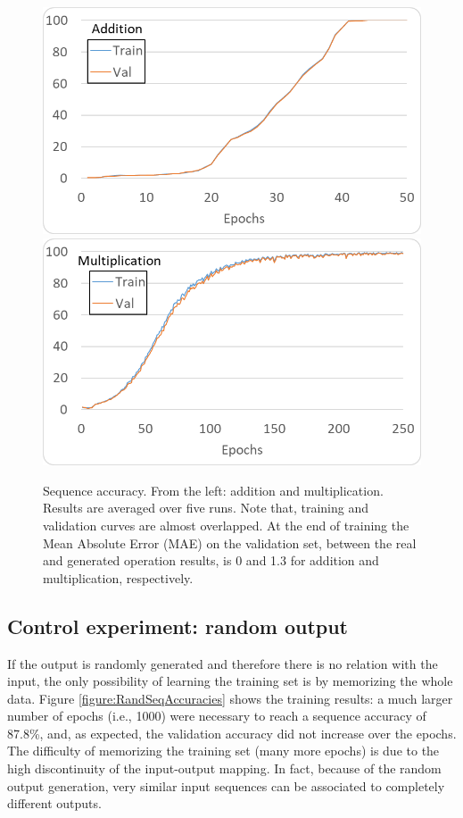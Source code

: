 \documentclass[final,1p,times,authoryear]{elsarticle}
\begin{document}
\begin{figure}[h]
\begin{center}
\includegraphics[scale=1.05]{AdditionSeqAccuracies}
\includegraphics[scale=1.05]{MultiplicationSeqAccuracies}
\end{center}
\caption{Sequence accuracy. From the left: addition and multiplication. Results are averaged over five runs. Note that, training and validation curves are almost overlapped. At the end of training the Mean Absolute Error (MAE) on the validation set, between the real and generated operation results, is 0 and 1.3 for addition and multiplication, respectively.}
\label{figure:AddMulSeqAccuracies}
\end{figure}

\subsection{Control experiment: random output}

If the output is randomly generated and therefore there is no relation with the input, the only possibility of learning the training set is by memorizing the whole data. Figure \ref{figure:RandSeqAccuracies} shows the training results: a much larger number of epochs (i.e., 1000) were necessary to reach a sequence accuracy of 87.8\%, and, as expected, the validation accuracy did not increase over the epochs. The difficulty of memorizing the training set (many more epochs) is due to the high discontinuity of the input-output mapping. In fact, because of the random output generation, very similar input sequences can be associated to completely different outputs.
\end{document}
